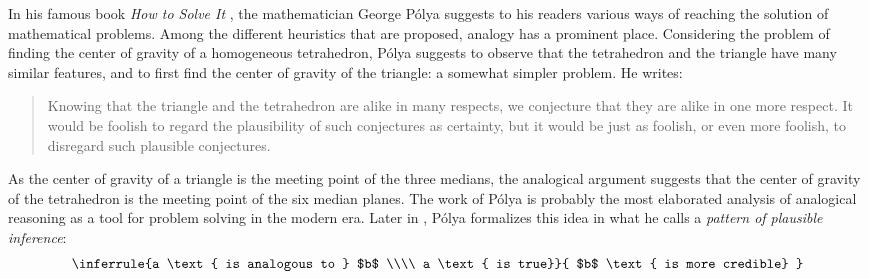 In his famous book \textit{How to Solve It} \cite{Pol45}, the mathematician
George P\'olya suggests to his readers various ways of reaching the solution
of mathematical problems. Among the different heuristics that are
proposed, analogy has a prominent place. Considering the problem of finding
the center of gravity of a homogeneous tetrahedron, P\'olya suggests to observe
that the tetrahedron and the triangle have many similar features, and to first
find the center of gravity of the triangle: a somewhat simpler problem. He
writes:

\begin{quote}
  Knowing that the triangle and the tetrahedron are alike in many respects, we
  conjecture that they are alike in one more respect. It would be foolish to
  regard the plausibility of such conjectures as certainty, but it would be
  just as foolish, or even more foolish, to disregard such plausible
  conjectures.
\end{quote}

As the center of gravity of a triangle is the meeting point of the three
medians, the analogical argument suggests that the center of gravity of the
tetrahedron is the meeting point of the six median planes. The work of P\'olya
is probably the most elaborated analysis of analogical reasoning as a tool for
problem solving in the modern era. Later in \cite{Pol54}, P\'olya formalizes
this idea in what he calls a \textit{pattern of plausible inference}:
$$
\inferrule{a \text{ is analogous to } $b$ \\\\ a \text{ is true}}{ $b$ \text{
  is more credible} }
$$


